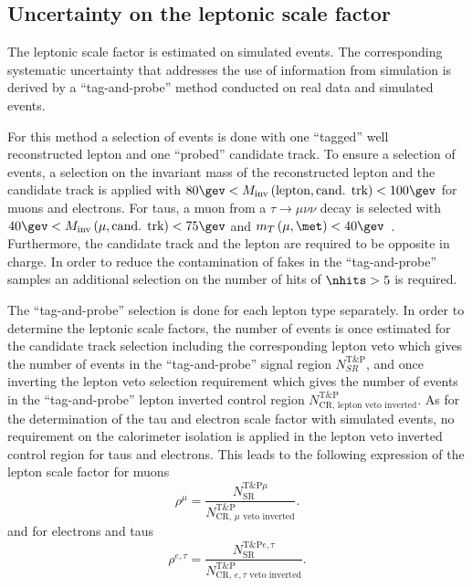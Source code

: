 \subsection{Uncertainty on the leptonic scale factor}
\label{sec:LeptonScaleUncertainty}

The leptonic scale factor \leptonscalefactor is estimated on simulated \WJets events.
The corresponding systematic uncertainty that addresses the use of information from simulation is derived by a ``tag-and-probe'' method conducted on real data and simulated events.

For this method a selection of \Zlep events is done with one ``tagged'' well reconstructed lepton and one ``probed'' candidate track.
To ensure a selection of \Zlep events, a selection on the invariant mass of  the reconstructed lepton and the candidate track is applied with $80\gev<M_{\text{inv}}\left( \text{lepton}, \text{cand. trk}  \right)<100\gev$ for muons and electrons.
For taus, a muon from a $\tau\rightarrow\mu\nu\nu$ decay is selected with $40\gev<M_{\text{inv}}\left( \mu, \text{cand. trk}  \right)<75\gev$ and $m_T\left(\mu,\met\right)<40\gev$~\cite{bib:CMS:DT_Thesis,bib:CMS:DT_8TeV_AN}.
Furthermore, the candidate track and the lepton are required to be opposite in charge.
In order to reduce the contamination of fakes in the ``tag-and-probe'' samples an additional selection on the number of hits of $\nhits>5$ is required.

The ``tag-and-probe'' selection is done for each lepton type separately.
In order to determine the leptonic scale factors, the number of events is once estimated for the candidate track selection including the corresponding lepton veto which gives the number of events in the ``tag-and-probe'' signal region $N_{SR}^{\text{T\&P}}$, and once inverting the lepton veto selection requirement which gives the number of events in the ``tag-and-probe'' lepton inverted control region $N_{\text{CR, lepton veto inverted}}^{\text{T\&P}}$.
As for the determination of the tau and electron scale factor with simulated \WJets events, no requirement on the calorimeter isolation is applied in the lepton veto inverted control region for taus and electrons.
This leads to the following expression of the lepton scale factor for muons
\begin{equation*}
\rho^{\mu} = \frac{N_{\text{SR}}^{\text{T\&P}\mu}}{N_{\text{CR, }\mu\text{ veto inverted}}^{\text{T\&P}}}.
\end{equation*}
and for electrons and taus 
\begin{equation*}
\rho^{e,\tau} = \frac{N_{\text{SR}}^{\text{T\&P}e,\tau}}{N_{\text{CR, }e,\tau \text{ veto inverted}}^{\text{T\&P}}}.
\end{equation*}

